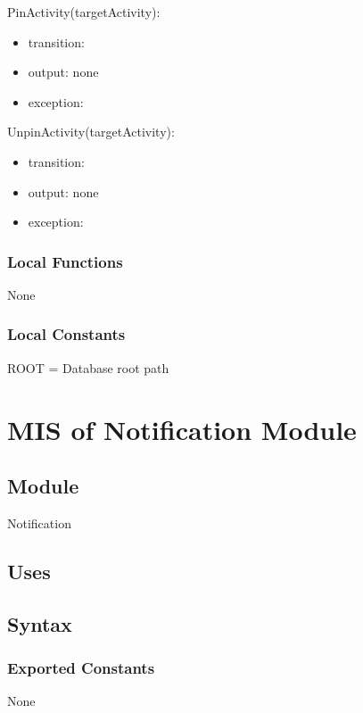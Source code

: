 \documentclass[12pt, titlepage]{article}
\begin{document}
PinActivity(targetActivity):
\begin{itemize}
  \item transition:
  \item output: none
  \item exception:
  \end{itemize}

UnpinActivity(targetActivity):
\begin{itemize}
  \item transition:
  \item output: none
  \item exception:
  \end{itemize}

\subsubsection{Local Functions}

None

\subsubsection{Local Constants}

ROOT = Database root path

\newpage

\section{MIS of Notification Module} \label{mNotify}

\subsection{Module}

Notification

\subsection{Uses}

\subsection{Syntax}

\subsubsection{Exported Constants}
None
\end{document}
